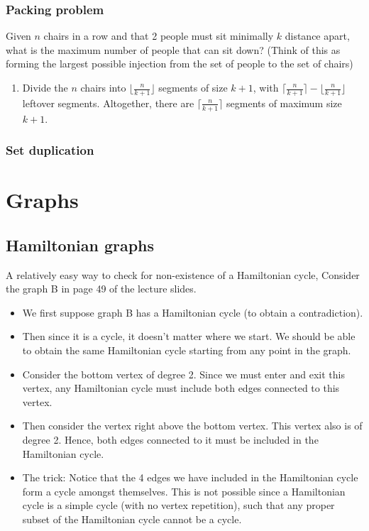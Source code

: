 \documentclass{article}
\begin{document}
\subsubsection{Packing problem}
Given $n$ chairs in a row and that 2 people must sit minimally $k$ distance apart, what is the maximum number of people that can sit down? (Think of this as forming the largest possible injection from the set of people to the set of chairs) 
\begin{enumerate}
    \item Divide the $n$ chairs into $\lfloor \frac{n}{k+1} \rfloor$ segments of size $k+1$, with $\lceil \frac{n}{k+1} \rceil - \lfloor \frac{n}{k+1} \rfloor$ leftover segments. Altogether, there are $\lceil \frac{n}{k+1} \rceil$ segments of maximum size $k+1$.
\end{enumerate}
\subsubsection{Set duplication}

\section{Graphs}
\subsection{Hamiltonian graphs}
A relatively easy way to check for non-existence of a Hamiltonian cycle,
Consider the graph B in page 49 of the lecture slides.
\begin{itemize}
    \item We first suppose graph B has a Hamiltonian cycle (to obtain a contradiction).
    \item Then since it is a cycle, it doesn't matter where we start. We should be able to obtain the same Hamiltonian cycle starting from any point in the graph. 
    \item Consider the bottom vertex of degree 2. Since we must enter and exit this vertex, any Hamiltonian cycle must include both edges connected to this vertex.
    \item Then consider the vertex right above the bottom vertex. This vertex also is of degree 2. Hence, both edges connected to it must be included in the Hamiltonian cycle.
    \item The trick: Notice that the 4 edges we have included in the Hamiltonian cycle form a cycle amongst themselves. This is not possible since a Hamiltonian cycle is a simple cycle (with no vertex repetition), such that any proper subset of the Hamiltonian cycle cannot be a cycle.
\end{itemize}
\end{document}
